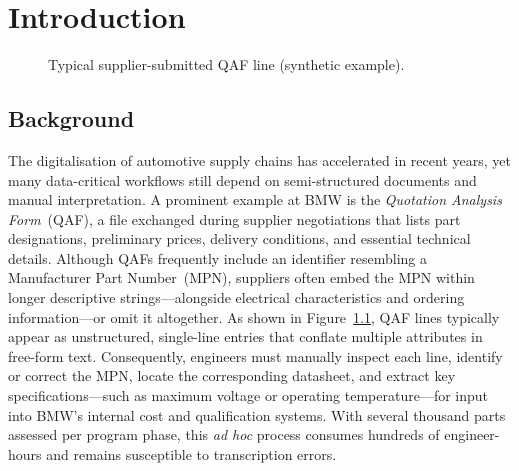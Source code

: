 \chapter{Introduction}\label{chapter:introduction}

\begin{figure}[H]
  \centering
  \caption{Typical supplier-submitted QAF line (synthetic example).}
  \label{fig:qaf-line-example}
\end{figure}

\section{Background }
The digitalisation of automotive supply chains has accelerated in recent years, yet many data-critical workflows still depend on semi-structured documents and manual interpretation.  
A prominent example at BMW is the \emph{Quotation Analysis Form}~(QAF), a file exchanged during supplier negotiations that lists part designations, preliminary prices, delivery conditions, and essential technical details.  
Although QAFs frequently include an identifier resembling a Manufacturer Part Number~(MPN), suppliers often embed the MPN within longer descriptive strings—alongside electrical characteristics and ordering information—or omit it altogether.  
As shown in Figure~\ref{fig:qaf-line-example}, QAF lines typically appear as unstructured, single-line entries that conflate multiple attributes in free-form text.  
Consequently, engineers must manually inspect each line, identify or correct the MPN, locate the corresponding datasheet, and extract key specifications—such as maximum voltage or operating temperature—for input into BMW’s internal cost and qualification systems.  
With several thousand parts assessed per program phase, this \emph{ad hoc} process consumes hundreds of engineer-hours and remains susceptible to transcription errors.

